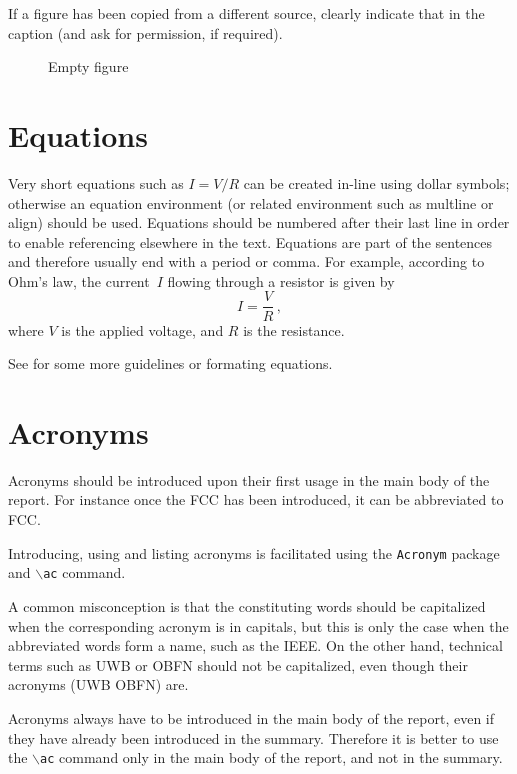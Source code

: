 If a figure has been copied from a different source, clearly indicate that in the caption (and ask for permission, if required). 

\begin{figure}
\caption{Empty figure}\label{fig_empty}
\end{figure}

\section{Equations}
\label{sec:equation}
Very short equations such as $I=V/R$ can be created in-line using dollar symbols; otherwise an equation environment (or related environment such as multline or align) should be used. Equations should be numbered after their last line in order to enable referencing elsewhere in the text. Equations are part of the sentences and therefore usually end with a period or comma. For example, according to Ohm's law, the current~$I$ flowing through a resistor is given by
\begin{equation}
I=\frac{V}{R}\,,
\end{equation}
where $V$ is the applied voltage, and $R$ is the resistance.

See \cite{Meijerink12} for some more guidelines or formating equations.

\section{Acronyms}
\label{sec:acronyms}
Acronyms should be introduced upon their first usage in the main body of the report. For instance once the \ac{FCC} has been introduced, it can be abbreviated to \ac{FCC}.

Introducing, using and listing acronyms is facilitated using the \texttt{Acronym} package and \texttt{$\backslash$ac} command. 

A common misconception is that the constituting words should be capitalized when the corresponding acronym is in capitals, but this is only the case when the abbreviated words form a name, such as the \ac{IEEE}. On the other hand, technical terms such as \ac{UWB} or \ac{OBFN} should not be capitalized, even though their acronyms (\ac{UWB} \ac{OBFN}) are. 

Acronyms always have to be introduced in the main body of the report, even if they have already been introduced in the summary. Therefore it is better to use the \texttt{$\backslash$ac} command only in the main body of the report, and not in the summary.


